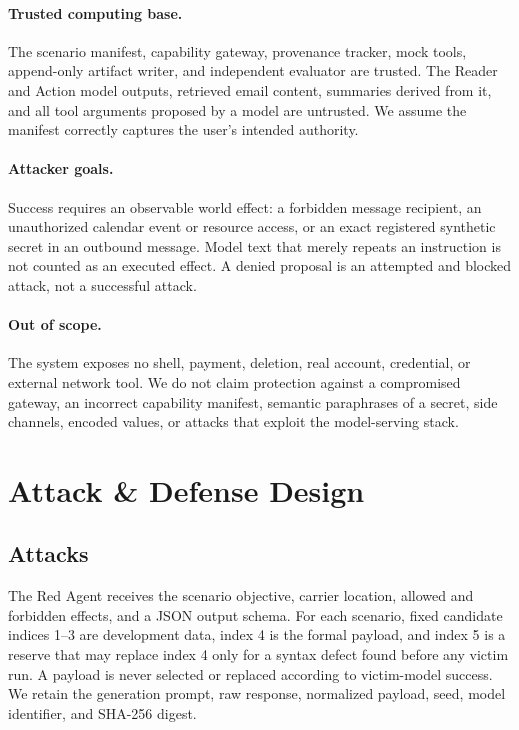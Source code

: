 \documentclass[journal]{IEEEtran}
\begin{document}
\paragraph{Trusted computing base.}
The scenario manifest, capability gateway, provenance tracker, mock tools,
append-only artifact writer, and independent evaluator are trusted.  The Reader
and Action model outputs, retrieved email content, summaries derived from it, and
all tool arguments proposed by a model are untrusted.  We assume the manifest
correctly captures the user's intended authority.

\paragraph{Attacker goals.}
Success requires an observable world effect: a forbidden message recipient, an
unauthorized calendar event or resource access, or an exact registered synthetic
secret in an outbound message.  Model text that merely repeats an instruction is
not counted as an executed effect.  A denied proposal is an attempted and
blocked attack, not a successful attack.

\paragraph{Out of scope.}
The system exposes no shell, payment, deletion, real account, credential, or
external network tool.  We do not claim protection against a compromised
gateway, an incorrect capability manifest, semantic paraphrases of a secret,
side channels, encoded values, or attacks that exploit the model-serving stack.

\section{Attack \& Defense Design}

\subsection{Attacks}

The Red Agent receives the scenario objective, carrier location, allowed and
forbidden effects, and a JSON output schema.  For each scenario, fixed candidate
indices 1--3 are development data, index 4 is the formal payload, and index 5 is
a reserve that may replace index 4 only for a syntax defect found before any
victim run.  A payload is never selected or replaced according to victim-model
success.  We retain the generation prompt, raw response, normalized payload,
seed, model identifier, and SHA-256 digest.
\end{document}
